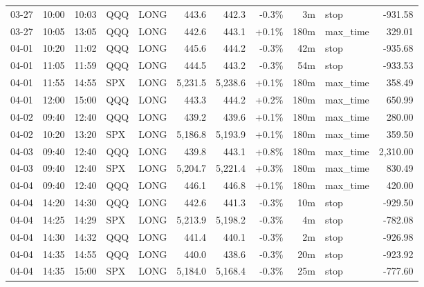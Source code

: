 \documentclass[11pt,a4paper,twoside]{article}
\begin{document}
\begin{center}
\begin{longtable}{>{\color{txtmain}}l l l l l r r r r >{\color{txtmain}}l r}
03-27 & 10:00 & 10:03 & QQQ & LONG & 443.6 & 442.3 & \textcolor{lossred}{-0.3\%} & 3m & stop & \textcolor{lossred}{-931.58} \\
03-27 & 10:05 & 13:05 & QQQ & LONG & 442.6 & 443.1 & \textcolor{wingreen}{+0.1\%} & 180m & max\_time & \textcolor{wingreen}{329.01} \\
04-01 & 10:20 & 11:02 & QQQ & LONG & 445.6 & 444.2 & \textcolor{lossred}{-0.3\%} & 42m & stop & \textcolor{lossred}{-935.68} \\
04-01 & 11:05 & 11:59 & QQQ & LONG & 444.5 & 443.2 & \textcolor{lossred}{-0.3\%} & 54m & stop & \textcolor{lossred}{-933.53} \\
04-01 & 11:55 & 14:55 & SPX & LONG & 5,231.5 & 5,238.6 & \textcolor{wingreen}{+0.1\%} & 180m & max\_time & \textcolor{wingreen}{358.49} \\
04-01 & 12:00 & 15:00 & QQQ & LONG & 443.3 & 444.2 & \textcolor{wingreen}{+0.2\%} & 180m & max\_time & \textcolor{wingreen}{650.99} \\
04-02 & 09:40 & 12:40 & QQQ & LONG & 439.2 & 439.6 & \textcolor{wingreen}{+0.1\%} & 180m & max\_time & \textcolor{wingreen}{280.00} \\
04-02 & 10:20 & 13:20 & SPX & LONG & 5,186.8 & 5,193.9 & \textcolor{wingreen}{+0.1\%} & 180m & max\_time & \textcolor{wingreen}{359.50} \\
04-03 & 09:40 & 12:40 & QQQ & LONG & 439.8 & 443.1 & \textcolor{wingreen}{+0.8\%} & 180m & max\_time & \textcolor{wingreen}{2,310.00} \\
04-03 & 09:40 & 12:40 & SPX & LONG & 5,204.7 & 5,221.4 & \textcolor{wingreen}{+0.3\%} & 180m & max\_time & \textcolor{wingreen}{830.49} \\
04-04 & 09:40 & 12:40 & QQQ & LONG & 446.1 & 446.8 & \textcolor{wingreen}{+0.1\%} & 180m & max\_time & \textcolor{wingreen}{420.00} \\
04-04 & 14:20 & 14:30 & QQQ & LONG & 442.6 & 441.3 & \textcolor{lossred}{-0.3\%} & 10m & stop & \textcolor{lossred}{-929.50} \\
04-04 & 14:25 & 14:29 & SPX & LONG & 5,213.9 & 5,198.2 & \textcolor{lossred}{-0.3\%} & 4m & stop & \textcolor{lossred}{-782.08} \\
04-04 & 14:30 & 14:32 & QQQ & LONG & 441.4 & 440.1 & \textcolor{lossred}{-0.3\%} & 2m & stop & \textcolor{lossred}{-926.98} \\
04-04 & 14:35 & 14:55 & QQQ & LONG & 440.0 & 438.6 & \textcolor{lossred}{-0.3\%} & 20m & stop & \textcolor{lossred}{-923.92} \\
04-04 & 14:35 & 15:00 & SPX & LONG & 5,184.0 & 5,168.4 & \textcolor{lossred}{-0.3\%} & 25m & stop & \textcolor{lossred}{-777.60} \\

\end{longtable}
\end{center}
\end{document}
